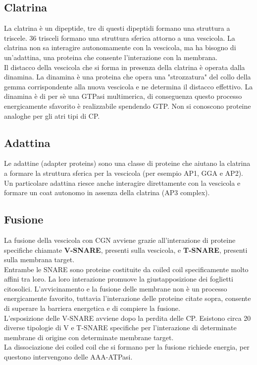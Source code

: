     \subsection{Clatrina}
        La clatrina è un dipeptide, tre di questi dipeptidi formano una struttura a triscele. 36 trisceli formano una struttura sferica attorno a una vescicola. 
        La clatrina non sa interagire autonomamente con la vescicola, ma ha bisogno di un'adattina, una proteina che consente l'interazione con la membrana.\\
        Il distacco della vescicola che si forma in presenza della clatrina è operata dalla dinamina. La dinamina è una proteina che opera una "strozzatura" del collo della gemma corrispondente alla nuova vescicola e ne determina il distacco effettivo. La dinamina è di per sè una GTPasi multimerica, di conseguenza questo processo energicamente sfavorito è realizzabile spendendo GTP. 
        Non si conoscono proteine analoghe per gli atri tipi di CP.
    
    \subsection{Adattina}
        Le adattine (adapter proteins) sono una classe di proteine che aiutano la clatrina a formare la struttura sferica per la vescicola (per esempio AP1, GGA e AP2).\\
        Un particolare adattina riesce anche interagire direttamente con la vescicola e formare un coat autonomo in assenza della clatrina (AP3 complex).
        
        
    \subsection{Fusione}
        La fusione della vescicola con CGN avviene grazie all'interazione di proteine specifiche chiamate\textbf{ V-SNARE}, presenti sulla vescicola, e \textbf{T-SNARE}, presenti sulla membrana target.\\
        Entrambe le SNARE sono proteine costituite da coiled coil specificamente molto affini tra loro. La loro interazione promuove la giustapposizione dei foglietti citosolici. 
        L'avvicinamento e la fusione delle membrane non è un processo energicamente favorito, tuttavia l'interazione delle proteine citate sopra, consente di superare la barriera energetica e di compiere la fusione.\\
        L'esposizione delle V-SNARE avviene dopo la perdita delle CP. Esistono circa 20 diverse tipologie di V e T-SNARE specifiche per l'interazione di determinate membrane di origine con determinate membrane target.\\
        La dissociazione dei coiled coil che si formano per la fusione richiede energia, per questono intervengono delle AAA-ATPasi.\\
        
